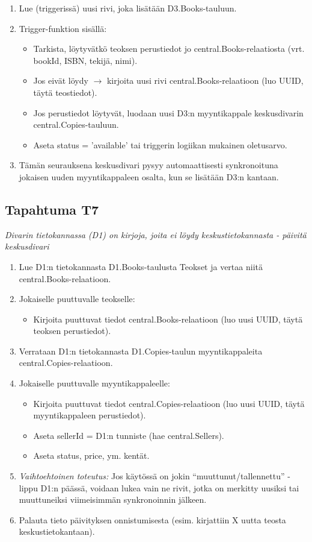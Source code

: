 \documentclass[11pt,a4paper]{article}
\begin{document}
\begin{enumerate}
	\item Lue (triggerissä) uusi rivi, joka lisätään D3.Books-tauluun.
	\item Trigger-funktion sisällä:
	      \begin{itemize}
		      \item Tarkista, löytyvätkö teoksen perustiedot jo central.Books-relaatiosta (vrt. bookId, ISBN, tekijä, nimi).
		      \item Jos eivät löydy $\to$ kirjoita uusi rivi central.Books-relaatioon (luo UUID, täytä teostiedot).
		      \item Jos perustiedot löytyvät, luodaan uusi D3:n myyntikappale keskusdivarin central.Copies-tauluun. 
		      \item Aseta status = 'available' tai triggerin logiikan mukainen oletusarvo.
	      \end{itemize}
	\item Tämän seurauksena keskusdivari pysyy automaattisesti synkronoituna jokaisen uuden myyntikappaleen osalta, kun se lisätään D3:n kantaan.
\end{enumerate}

\subsection{Tapahtuma T7}
{\large{\textit{Divarin tietokannassa (D1) on kirjoja, joita ei löydy keskustietokannasta - päivitä keskusdivari}}}

\begin{enumerate}
	\item Lue D1:n tietokannasta D1.Books-taulusta Teokset ja vertaa niitä central.Books-relaatioon.
	\item Jokaiselle puuttuvalle teokselle:
	      \begin{itemize}
		      \item Kirjoita puuttuvat tiedot central.Books-relaatioon (luo uusi UUID, täytä teoksen perustiedot).
	      \end{itemize}
	\item Verrataan D1:n tietokannasta D1.Copies-taulun myyntikappaleita central.Copies-relaatioon.
	\item Jokaiselle puuttuvalle myyntikappaleelle:
	      \begin{itemize}
		      \item Kirjoita puuttuvat tiedot central.Copies-relaatioon (luo uusi UUID, täytä myyntikappaleen perustiedot).
		      \item Aseta sellerId = D1:n tunniste (hae central.Sellers).
		      \item Aseta status, price, ym. kentät.
	      \end{itemize}
	\item \textit{Vaihtoehtoinen toteutus:} Jos käytössä on jokin “muuttunut/tallennettu” -lippu D1:n päässä, voidaan lukea vain ne rivit, jotka on merkitty uusiksi tai muuttuneiksi viimeisimmän synkronoinnin jälkeen.
	\item Palauta tieto päivityksen onnistumisesta (esim. kirjattiin X uutta teosta keskustietokantaan).
\end{enumerate}
\end{document}
